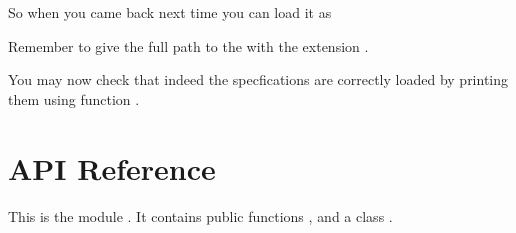\documentclass[letterpaper,10pt,english]{sphinxmanual}
\begin{document}
\sphinxAtStartPar
So when you came back next time you can load it as

\begin{sphinxVerbatim}[commandchars=\\\{\}]
   
\end{sphinxVerbatim}

\sphinxAtStartPar
Remember to give the full path to the  with the extension .

\sphinxAtStartPar
You may now check that indeed the specfications are correctly loaded by printing them using function .

\begin{sphinxVerbatim}[commandchars=\\\{\}]
   
\end{sphinxVerbatim}

\sphinxstepscope


\chapter{API Reference}
\label{\detokenize{api:module-furs}}\label{\detokenize{api:api-reference}}\label{\detokenize{api:api}}\label{\detokenize{api::doc}}
\sphinxAtStartPar
This is the module {\hyperref[\detokenize{api:module-furs}]{}}.
It contains public functions {\hyperref[\detokenize{api:furs.save_furs}]{}}, {\hyperref[\detokenize{api:furs.load_furs}]{}} and a class {\hyperref[\detokenize{api:module-furs}]{}}.
\end{document}

